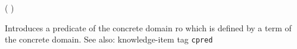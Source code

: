   (  )

Introduces a predicate of the concrete domain ro which is defined by a
term of the concrete domain.
See also: knowledge-item tag {\tt cpred}


